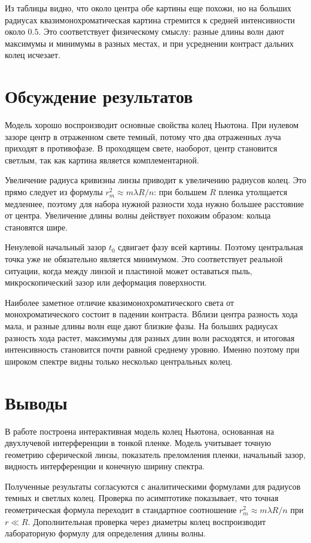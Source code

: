 \documentclass[12pt,a4paper]{article}
\begin{document}
Из таблицы видно, что около центра обе картины еще похожи, но на больших радиусах
квазимонохроматическая картина стремится к средней интенсивности около \(0.5\). Это соответствует
физическому смыслу: разные длины волн дают максимумы и минимумы в разных местах, и при усреднении
контраст дальних колец исчезает.

\section{Обсуждение результатов}

Модель хорошо воспроизводит основные свойства колец Ньютона. При нулевом зазоре центр в отраженном
свете темный, потому что два отраженных луча приходят в противофазе. В проходящем свете, наоборот,
центр становится светлым, так как картина является комплементарной.

Увеличение радиуса кривизны линзы приводит к увеличению радиусов колец. Это прямо следует из
формулы \(r_m^2\approx m\lambda R/n\): при большем \(R\) пленка утолщается медленнее, поэтому для
набора нужной разности хода нужно большее расстояние от центра. Увеличение длины волны действует
похожим образом: кольца становятся шире.

Ненулевой начальный зазор \(t_0\) сдвигает фазу всей картины. Поэтому центральная точка уже не
обязательно является минимумом. Это соответствует реальной ситуации, когда между линзой и пластиной
может оставаться пыль, микроскопический зазор или деформация поверхности.

Наиболее заметное отличие квазимонохроматического света от монохроматического состоит в падении
контраста. Вблизи центра разность хода мала, и разные длины волн еще дают близкие фазы. На больших
радиусах разность хода растет, максимумы для разных длин волн расходятся, и итоговая интенсивность
становится почти равной среднему уровню. Именно поэтому при широком спектре видны только несколько
центральных колец.

\section{Выводы}

В работе построена интерактивная модель колец Ньютона, основанная на двухлучевой интерференции в
тонкой пленке. Модель учитывает точную геометрию сферической линзы, показатель преломления пленки,
начальный зазор, видность интерференции и конечную ширину спектра.

Полученные результаты согласуются с аналитическими формулами для радиусов темных и светлых колец.
Проверка по асимптотике показывает, что точная геометрическая формула переходит в стандартное
соотношение \(r_m^2\approx m\lambda R/n\) при \(r\ll R\). Дополнительная проверка через диаметры
колец воспроизводит лабораторную формулу для определения длины волны.
\end{document}
